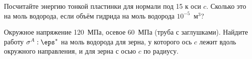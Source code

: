 \begin{exercise}
Посчитайте энергию тонкой пластинки для нормали под 15\textdegree{} к оси $c$. Сколько это на моль водорода, если
объём гидрида на моль водорода $10^{-5}$~м$^3$?
\end{exercise}

\begin{exercise}
Окружное напряжение 120~МПа, осевое 60~МПа (труба с заглушками). Найдите работу $\sigma^A:\eps^*$ на моль водорода для
зерна, у которого ось $c$ лежит вдоль окружного направления, и для зерна с осью $c$ по радиусу.
\end{exercise}
